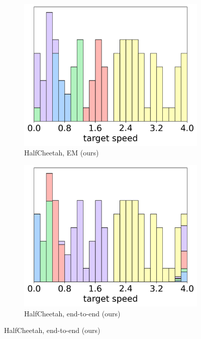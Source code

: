 \documentclass[letterpaper]{article} %
\begin{document}
\begin{figure}[t]
\begin{center}
    \begin{subfigure}{0.3\textwidth}
        \centering
        \caption{HalfCheetah, EM (ours)}
        \includegraphics[width=\linewidth]{pics/histograms/em/HalfCheetah.png}
    \end{subfigure}\hspace{10pt}%
    \begin{subfigure}{0.3\textwidth}
        \centering
        \caption{HalfCheetah, end-to-end (ours)}
        \includegraphics[width=\linewidth]{pics/histograms/end-to-end/HalfCheetah.png}

\end{subfigure}
\end{center}
\end{figure}
\end{document}

